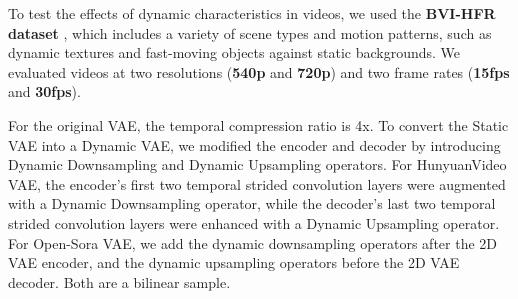


To test the effects of dynamic characteristics in videos, we used the \textbf{BVI-HFR dataset} \cite{mackin2018study}, which includes a variety of scene types and motion patterns, such as dynamic textures and fast-moving objects against static backgrounds. We evaluated videos at two resolutions (\textbf{540p} and \textbf{720p}) and two frame rates (\textbf{15fps} and \textbf{30fps}).

For the original VAE, the temporal compression ratio is 4x. To convert the Static VAE into a Dynamic VAE, we modified the encoder and decoder by introducing Dynamic Downsampling and Dynamic Upsampling operators. For HunyuanVideo VAE, the encoder's first two temporal strided convolution layers were augmented with a Dynamic Downsampling operator, while the decoder's last two temporal strided convolution layers were enhanced with a Dynamic Upsampling operator.
For Open-Sora VAE, we add the dynamic downsampling operators after the 2D VAE encoder, and the dynamic upsampling operators before the 2D VAE decoder. Both are a bilinear sample.

